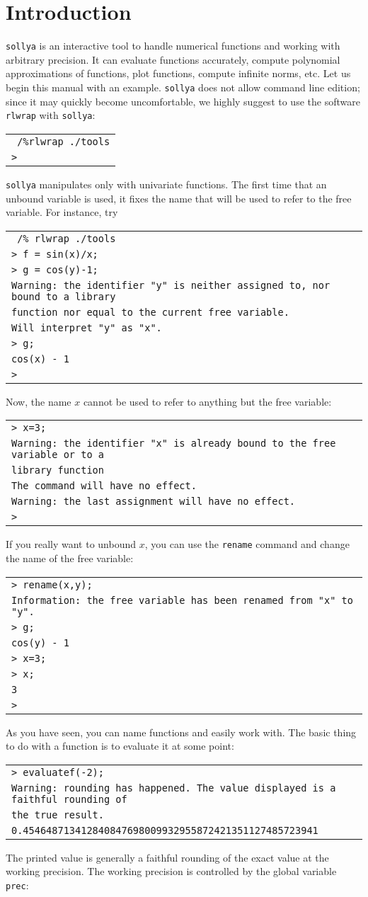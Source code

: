 \documentclass[a4paper]{article}
\newcommand{\com}[1]{\texttt{#1}}
\newcommand{\sollya}{\texttt{sollya}\xspace}
\newcommand{\rlwrap}{\texttt{rlwrap}\xspace}
\newcommand{\code}[1]{\begin{center}
\begin{tabular}{|p{14.8cm}|}
\hline
#1
\hline
\end{tabular}
\end{center}
}
\newcommand{\ligne}[1]{\texttt{#1}\\}
\begin{document}
\section{Introduction}
\sollya is an interactive tool to handle numerical functions and working with arbitrary precision. It can evaluate functions accurately, compute polynomial approximations of functions, plot functions, compute infinite norms, etc. Let us begin this manual with an example. \sollya does not allow command line edition; since it may quickly become uncomfortable, we highly suggest to use the software \rlwrap with \sollya:

\code{
\ligne{~/\%rlwrap ./tools}
\ligne{>}
}

\sollya manipulates only with univariate functions. The first time that an unbound variable is used, it fixes the name that will be used to refer to the free variable. For instance, try

\code{
\ligne{~/\% rlwrap ./tools}
\ligne{> f = sin(x)/x;}
\ligne{> g = cos(y)-1;}
\ligne{Warning: the identifier "y" is neither assigned to, nor bound to a library }
\ligne{function nor equal to the current free variable.}
\ligne{Will interpret "y" as "x".}
\ligne{> g;}
\ligne{cos(x) - 1}
\ligne{>} 
}

Now, the name $x$ cannot be used to refer to anything but the free variable:

\code{
\ligne{> x=3;}
\ligne{Warning: the identifier "x" is already bound to the free variable or to a }
\ligne{library function}
\ligne{The command will have no effect.}
\ligne{Warning: the last assignment will have no effect.}
\ligne{>}
}

If you really want to unbound $x$, you can use the \com{rename} command and change the name of the free variable:

\code{
\ligne{> rename(x,y);}
\ligne{Information: the free variable has been renamed from "x" to "y".}
\ligne{> g;}
\ligne{cos(y) - 1}
\ligne{> x=3;}
\ligne{> x;}
\ligne{3}
\ligne{> }
}

As you have seen, you can name functions and easily work with. The basic thing to do with a function is to evaluate it at some point:

\code{
\ligne{> evaluatef(-2);}
\ligne{Warning: rounding has happened. The value displayed is a faithful rounding of }
\ligne{the true result.}
\ligne{0.454648713412840847698009932955872421351127485723941}
}

The printed value is generally a faithful rounding of the exact value at the working precision. The working precision is controlled by the global variable \com{prec}:
\end{document}
